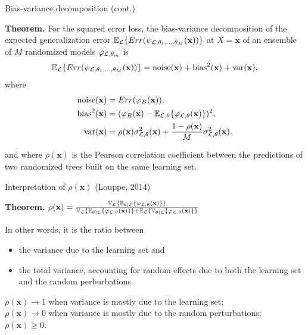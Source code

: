 \documentclass{beamer}
\begin{document}
\begin{frame}{Bias-variance decomposition (cont.)}

{\bf Theorem.}
For the squared error loss, the bias-variance decomposition of the expected
generalization error $\mathbb{E}_{\cal L} \{ Err( \psi_{{\cal L},\theta_1,\dots,\theta_M}(\mathbf{x}))
\}$ at $X=\mathbf{x}$ of an ensemble of $M$ randomized models $\varphi_{{\cal L},\theta_m}$ is
\begin{equation*}
\mathbb{E}_{\cal L} \{ Err(\psi_{{\cal L},\theta_1,\dots,\theta_M}(\mathbf{x})) \} = \text{noise}(\mathbf{x}) + \text{bias}^2(\mathbf{x}) + \text{var}(\mathbf{x}),
\end{equation*}
where
\begin{align*}
\text{noise}(\mathbf{x}) &= Err(\varphi_B(\mathbf{x})), \\
\text{bias}^2(\mathbf{x}) &= (\varphi_B(\mathbf{x}) - \mathbb{E}_{{\cal L},\theta} \{ \varphi_{{\cal L},\theta}(\mathbf{x}) \} )^2, \\
\text{var}(\mathbf{x}) &= \rho(\mathbf{x}) \sigma^2_{{\cal L},\theta}(\mathbf{x}) + \frac{1 - \rho(\mathbf{x})}{M} \sigma^2_{{\cal L},\theta}(\mathbf{x}).
\end{align*}

and where $\rho(\mathbf{x})$ is the Pearson correlation coefficient between
the predictions of two randomized trees built on the same learning set.

\end{frame}

\begin{frame}{Interpretation of $\rho(\mathbf{x})$ {\scriptsize (Louppe, 2014)}}

{\bf Theorem.} $\rho(\mathbf{x}) = \frac{\mathbb{V}_{\cal L} \{ \mathbb{E}_{\theta|{\cal L}} \{ \varphi_{{\cal L},\theta}(\mathbf{x}) \} \}}{\mathbb{V}_{\cal L} \{ \mathbb{E}_{\theta|{\cal L}} \{ \varphi_{{\cal L},\theta}(\mathbf{x}) \} \} + \mathbb{E}_{\cal L} \{ \mathbb{V}_{\theta|{\cal L}} \{ \varphi_{{\cal L},\theta}(\mathbf{x}) \} \}}$

\vspace{1cm}

In other words, it is the ratio between
\begin{itemize}
\item the variance due to the learning set and
\item the total variance, accounting for random effects due to both the
  learning set and the random perburbations.
\end{itemize}

\bigskip

$\rho(\mathbf{x}) \to 1$ when variance is mostly due to the learning set; \\
$\rho(\mathbf{x}) \to 0$ when variance is mostly due to the random perturbations;\\
$\rho(\mathbf{x}) \geq 0$.


\end{frame}
\end{document}
